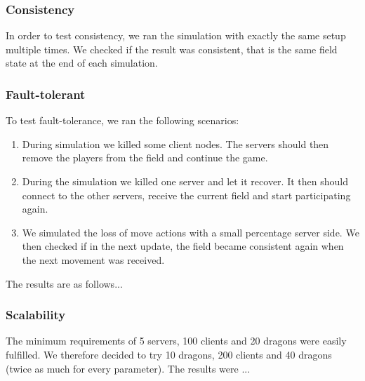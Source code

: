 	\subsubsection{Consistency}
	\label{subsubsec:consistency}
		In order to test consistency, we ran the simulation with exactly the same setup multiple times.
		We checked if the result was consistent, that is the same field state at the end of each simulation. 
		
	\subsubsection{Fault-tolerant}
	\label{subsubsec:fault-tolerant}
		To test fault-tolerance, we ran the following scenarios:
		\begin{enumerate}
			\item During simulation we killed some client nodes. The servers should then remove the players from the field and continue the game.
			\item During the simulation we killed one server and let it recover. It then should connect to the other servers, receive the current field and start participating again.
			\item We simulated the loss of move actions with a small percentage server side. We then checked if in the next update, the field became consistent again when the next movement was received.
		\end{enumerate}
		
		The results are as follows... 
		
	\subsubsection{Scalability}
	\label{subsubsec:scalability}
		The minimum requirements of 5 servers, 100 clients and 20 dragons were easily fulfilled. We therefore decided to try 10 dragons, 200 clients and 40 dragons (twice as much for every parameter). The results were ...
